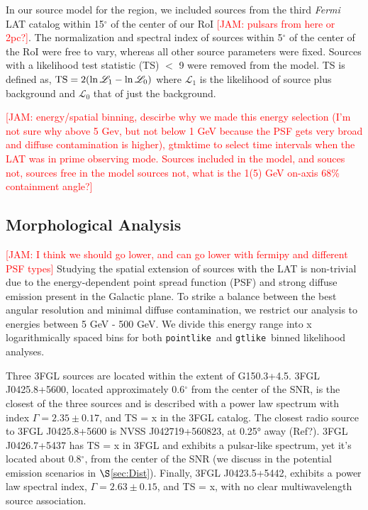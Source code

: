\documentclass[preprint2]{aastex}
\newcommand{\kibitz}[2]{\ifnum\Comments=1\textcolor{#1}{#2}\fi}
\newcommand{\jamie}[1]{\kibitz{red}      {[JAM: #1]}}
\newcommand{\FermiLat}{\emph{Fermi} LAT }     %
\newcommand{\ptlike}{{\tt pointlike}}
\newcommand{\gtlike}{{\tt gtlike}}
\newcommand{\Gone}{G150.3+4.5}
\begin{document}
In our source model for the region, we included sources from the third \FermiLat catalog \citep[3FGL]{3FGL} within 15$^\circ$ of the center of our RoI \jamie{pulsars from here or 2pc?}. The normalization and spectral index of sources within 5$^{\circ}$ of the center of the RoI were free to vary, whereas all other source parameters were fixed. Sources with a likelihood test statistic (TS) $<$ 9 were removed from the model.  TS is defined as, ${\rm TS}=2(\ln \mathcal{L}_1 - \ln \mathcal{L}_0)$ where $\mathcal{L}_1$ is the likelihood of source plus background and  $\mathcal{L}_0$ that of just the background.

\jamie{energy/spatial  binning, descirbe why we made this energy selection (I'm not sure why above 5 Gev, but not below 1 GeV because the PSF gets very broad and diffuse contamination is higher), gtmktime to select time intervals when the LAT was in prime observing mode. Sources included in the model, and souces not, sources free in the model sources not, what is the 1(5) GeV on-axis 68\% containment angle?}

\subsection{\label{sec:LATmorph}Morphological Analysis}
\jamie{I think we should go lower, and can go lower with fermipy and different PSF types}
Studying the spatial extension of sources with the LAT is non-trivial due to the energy-dependent point spread function (PSF) and strong diffuse emission present in the Galactic plane. To strike a balance between the best angular resolution and minimal diffuse contamination, we restrict our analysis to energies between 5 GeV - 500 GeV. We divide this energy range into x logarithmically spaced bins for both \ptlike~and \gtlike~binned likelihood analyses.

Three  3FGL sources are located within the extent of \Gone. 3FGL J0425.8+5600, located approximately 0.6$^\circ$ from the center of the SNR, is the closest of the three sources and is described with a power law spectrum with index $\Gamma = 2.35\pm 0.17$, and TS = x in the 3FGL catalog. The closest radio source to 3FGL J0425.8+5600 is NVSS J042719+560823, at 0.25° away (Ref?). 3FGL J0426.7+5437 has TS = x in 3FGL and exhibits a pulsar-like spectrum, yet it's located about 0.8$^{\circ}$, from the center of the SNR (we discuss in the potential emission scenarios in $\S$\ref{sec:Dist}). Finally,  3FGL J0423.5+5442, exhibits a power law spectral index, $\Gamma = 2.63\pm 0.15$, and TS = x, with no clear multiwavelength source association.
\end{document}
